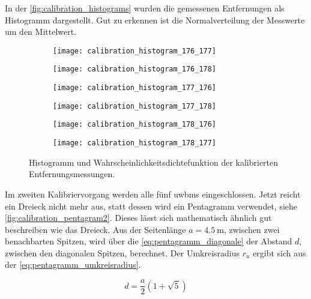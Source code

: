 In der \autoref{fig:calibration_histograms} wurden die gemessenen Entfernungen als Histogramm dargestellt. Gut zu erkennen ist die Normalverteilung der Messwerte um den Mittelwert.

\begin{figure}[h]
	\centering
	\begin{subfigure}[b]{0.32\linewidth}
		\centering
		\texttt{[image: calibration\_histogram\_176\_177]}
	\end{subfigure}
	\hfill
	\begin{subfigure}[b]{0.32\linewidth}
		\centering
		\texttt{[image: calibration\_histogram\_176\_178]}
	\end{subfigure}
	\hfill
	\begin{subfigure}[b]{0.32\linewidth}
		\centering
		\texttt{[image: calibration\_histogram\_177\_176]}
	\end{subfigure}
	\par
	\bigskip
	\begin{subfigure}[b]{0.32\linewidth}
		\centering
		\texttt{[image: calibration\_histogram\_177\_178]}
	\end{subfigure}
	\hfill
	\begin{subfigure}[b]{0.32\linewidth}
		\centering
		\texttt{[image: calibration\_histogram\_178\_176]}
	\end{subfigure}
	\hfill
	\begin{subfigure}[b]{0.32\linewidth}
		\centering
		\texttt{[image: calibration\_histogram\_178\_177]}
	\end{subfigure}
	\caption{Histogramm und Wahrscheinlichkeitsdichtefunktion der kalibrierten Entfernungsmessungen.}
	\label{fig:calibration_histograms}
\end{figure}

Im zweiten Kalibriervorgang werden alle fünf \Glspl{uwbm} eingeschlossen. Jetzt reicht ein Dreieck nicht mehr aus, statt dessen wird ein Pentagramm verwendet, siehe \autoref{fig:calibration_pentagram2}. Dieses lässt sich mathematisch ähnlich gut beschreiben wie das Dreieck. Aus der Seitenlänge $a = \SI{4.5}{\meter}$, zwischen zwei benachbarten Spitzen, wird über die \autoref{eq:pentagramm_diagonale} der Abstand $d$, zwischen den diagonalen Spitzen, berechnet. Der Umkreisradius $r_u$ ergibt sich aus der \autoref{eq:pentagramm_umkreisradius}.

\begin{equation}
d = \frac{a}{2} \left(1 + \sqrt{5} \right) \label{eq:pentagramm_diagonale}
\end{equation}

